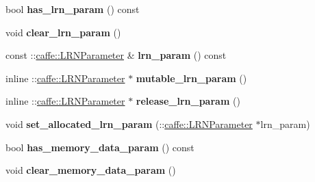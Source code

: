 \begin{DoxyCompactItemize}
\item 
\mbox{\label{classcaffe_1_1_layer_parameter_abbaba38d29bf09018524607cde13190c}} 
bool {\bfseries has\+\_\+lrn\+\_\+param} () const
\item 
\mbox{\label{classcaffe_1_1_layer_parameter_ac77444e83d627ddc21dab023de006052}} 
void {\bfseries clear\+\_\+lrn\+\_\+param} ()
\item 
\mbox{\label{classcaffe_1_1_layer_parameter_a81169a336c2959714a5b7084fa7e1bbb}} 
const \+::\mbox{\hyperlink{classcaffe_1_1_l_r_n_parameter}{caffe\+::\+L\+R\+N\+Parameter}} \& {\bfseries lrn\+\_\+param} () const
\item 
\mbox{\label{classcaffe_1_1_layer_parameter_a1223e3ab316ca119f93bd6a75f8b0bd0}} 
inline \+::\mbox{\hyperlink{classcaffe_1_1_l_r_n_parameter}{caffe\+::\+L\+R\+N\+Parameter}} $\ast$ {\bfseries mutable\+\_\+lrn\+\_\+param} ()
\item 
\mbox{\label{classcaffe_1_1_layer_parameter_a550092b31ce82768e3b73da7223b819a}} 
inline \+::\mbox{\hyperlink{classcaffe_1_1_l_r_n_parameter}{caffe\+::\+L\+R\+N\+Parameter}} $\ast$ {\bfseries release\+\_\+lrn\+\_\+param} ()
\item 
\mbox{\label{classcaffe_1_1_layer_parameter_ac37985a2321c6e512b325ef32f8db657}} 
void {\bfseries set\+\_\+allocated\+\_\+lrn\+\_\+param} (\+::\mbox{\hyperlink{classcaffe_1_1_l_r_n_parameter}{caffe\+::\+L\+R\+N\+Parameter}} $\ast$lrn\+\_\+param)
\item 
\mbox{\label{classcaffe_1_1_layer_parameter_aaca42c251ae0bba3821057eb92ec7226}} 
bool {\bfseries has\+\_\+memory\+\_\+data\+\_\+param} () const
\item 
\mbox{\label{classcaffe_1_1_layer_parameter_aa4e5f5ebd110c89fb10270addf5d53ac}} 
void {\bfseries clear\+\_\+memory\+\_\+data\+\_\+param} ()
\item 
\mbox{\label{classcaffe_1_1_layer_parameter_abdbbf656796b93298806d56b383e44bd}} 

\end{DoxyCompactItemize}
